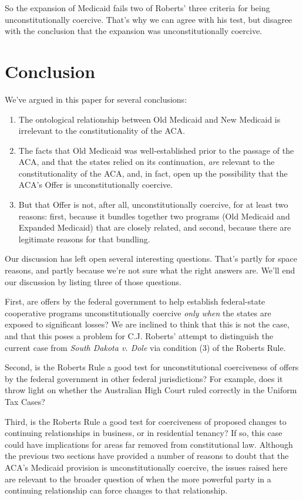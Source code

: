 \documentclass[
  11pt,
  letterpaper,
  DIV=11,
  numbers=noendperiod,
  oneside]{scrartcl}
\begin{document}
So the expansion of Medicaid fails two of Roberts' three criteria for
being unconstitutionally coercive. That's why we can agree with his
test, but disagree with the conclusion that the expansion was
unconstitutionally coercive.

\section{Conclusion}\label{conclusion}

We've argued in this paper for several conclusions:

\begin{enumerate}
\def\labelenumi{\arabic{enumi}.}
\item
  The ontological relationship between Old Medicaid and New Medicaid is
  irrelevant to the constitutionality of the ACA.
\item
  The facts that Old Medicaid was well-established prior to the passage
  of the ACA, and that the states relied on its continuation, \emph{are}
  relevant to the constitutionality of the ACA, and, in fact, open up
  the possibility that the ACA's Offer is unconstitutionally coercive.
\item
  But that Offer is not, after all, unconstitutionally coercive, for at
  least two reasons: first, because it bundles together two programs
  (Old Medicaid and Expanded Medicaid) that are closely related, and
  second, because there are legitimate reasons for that bundling.
\end{enumerate}

Our discussion has left open several interesting questions. That's
partly for space reasons, and partly because we're not sure what the
right answers are. We'll end our discussion by listing three of those
questions.

First, are offers by the federal government to help establish
federal-state cooperative programs unconstitutionally coercive
\emph{only when} the states are exposed to significant losses? We are
inclined to think that this is not the case, and that this poses a
problem for C.J. Roberts' attempt to distinguish the current case from
\emph{South Dakota v. Dole} via condition (3) of the Roberts Rule.

Second, is the Roberts Rule a good test for unconstitutional
coerciveness of offers by the federal government in other federal
jurisdictions? For example, does it throw light on whether the
Australian High Court ruled correctly in the Uniform Tax
Cases?

Third, is the Roberts Rule a good test for coerciveness of proposed
changes to continuing relationships in business, or in residential
tenancy? If so, this case could have implications for areas far removed
from constitutional law. Although the previous two sections have
provided a number of reasons to doubt that the ACA's Medicaid provision
is unconstitutionally coercive, the issues raised here are relevant to
the broader question of when the more powerful party in a continuing
relationship can force changes to that relationship.
\end{document}

